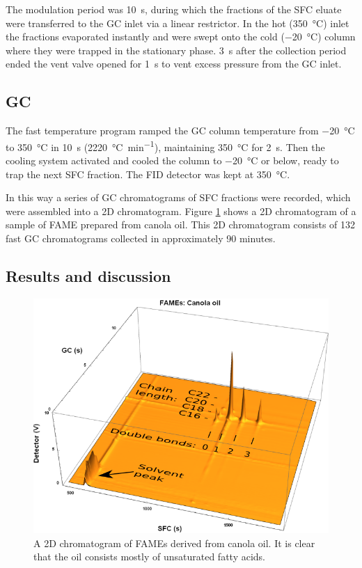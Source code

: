 The modulation period was \SI{10}{\second}, during which the fractions of the SFC
eluate were transferred to the GC inlet via a linear restrictor. In the hot
(\SI{350}{\celsius}) inlet the fractions evaporated instantly and were swept onto the
cold (\SI{-20}{\celsius}) column where they were trapped in the stationary phase.
\SI{3}{\second} after the collection period ended the vent valve opened for
\SI{1}{\second} to vent excess pressure from the GC inlet.

\subsection{GC}

The fast temperature program ramped the GC column temperature from
\SI{-20}{\celsius} to \SI{350}{\celsius} in \SI{10}{s}
(\SI{2220}{\celsius\per\minute}), maintaining \SI{350}{\celsius} for
\SI{2}{\second}. Then the cooling system activated and cooled the column to
\SI{-20}{\celsius} or below, ready to trap the next SFC fraction. The FID
detector was kept at \SI{350}{\celsius}.

In this way a series of GC chromatograms of SFC fractions were recorded, which
were assembled into a 2D chromatogram. Figure \ref{fig:2DCanola} shows
a 2D chromatogram of a sample of FAME prepared from canola oil. This 2D
chromatogram consists of 132 fast GC chromatograms collected in approximately 90
minutes.

\subsection{Results and discussion}

\begin{figure}
\centering
\includegraphics[width=\textwidth]{Figures/Interpretation.png}
\decoRule

\caption[SFC×GC of canola oil]{A 2D chromatogram of FAMEs derived from
canola oil. It is clear that the oil consists mostly of unsaturated fatty
acids.}

\label{fig:2DCanola}
\end{figure}

